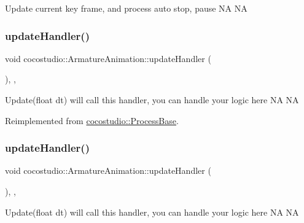 Update current key frame, and process auto stop, pause  NA  NA \mbox{\label{classcocostudio_1_1ArmatureAnimation_ae2fd5441c69b5ac036116bbe548f5595}} 
\subsubsection{\texorpdfstring{update\+Handler()}{updateHandler()}\hspace{0.1cm}{\footnotesize\ttfamily [1/2]}}
{\footnotesize\ttfamily void cocostudio\+::\+Armature\+Animation\+::update\+Handler (\begin{DoxyParamCaption}{ }\end{DoxyParamCaption})\hspace{0.3cm}{\ttfamily [override]}, {\ttfamily [protected]}, {\ttfamily [virtual]}}

Update(float dt) will call this handler, you can handle your logic here  NA  NA 

Reimplemented from \hyperlink{classcocostudio_1_1ProcessBase_adb15615e852617daf7a4f13b17bfc553}{cocostudio\+::\+Process\+Base}.

\mbox{\label{classcocostudio_1_1ArmatureAnimation_ae2fd5441c69b5ac036116bbe548f5595}} 
\subsubsection{\texorpdfstring{update\+Handler()}{updateHandler()}\hspace{0.1cm}{\footnotesize\ttfamily [2/2]}}
{\footnotesize\ttfamily void cocostudio\+::\+Armature\+Animation\+::update\+Handler (\begin{DoxyParamCaption}{ }\end{DoxyParamCaption})\hspace{0.3cm}{\ttfamily [override]}, {\ttfamily [protected]}, {\ttfamily [virtual]}}

Update(float dt) will call this handler, you can handle your logic here  NA  NA 

